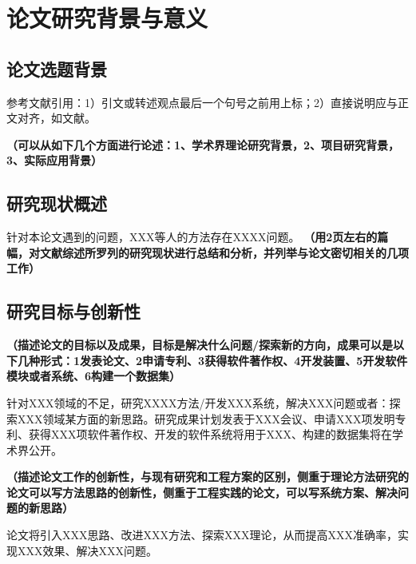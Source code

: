 \section{论文研究背景与意义}

\subsection{论文选题背景}
参考文献引用：1）引文或转述观点最后一个句号之前用上标；2）直接说明应与正文对齐，如文献\cite{yan2018spatial,wu2020comprehensive}。

\textbf{\color{red}（可以从如下几个方面进行论述：1、学术界理论研究背景，2、项目研究背景，3、实际应用背景）}

\subsection{研究现状概述}

针对本论文遇到的问题，XXX等人的方法存在XXXX问题。
\textbf{\color{red}
（用2页左右的篇幅，对文献综述所罗列的研究现状进行总结和分析，并列举与论文密切相关的几项工作）}


\subsection{研究目标与创新性}

\textbf{\color{red}（描述论文的目标以及成果，目标是解决什么问题/探索新的方向，成果可以是以下几种形式：1发表论文、2申请专利、3获得软件著作权、4开发装置、5开发软件模块或者系统、6构建一个数据集）}

针对XXX领域的不足，研究XXXX方法/开发XXX系统，解决XXX问题或者：探索XXX领域某方面的新思路。研究成果计划发表于XXX会议、申请XXX项发明专利、获得XXX项软件著作权、开发的软件系统将用于XXX、构建的数据集将在学术界公开。

\textbf{\color{red}（描述论文工作的创新性，与现有研究和工程方案的区别，侧重于理论方法研究的论文可以写方法思路的创新性，侧重于工程实践的论文，可以写系统方案、解决问题的新思路）}

论文将引入XXX思路、改进XXX方法、探索XXX理论，从而提高XXX准确率，实现XXX效果、解决XXX问题。